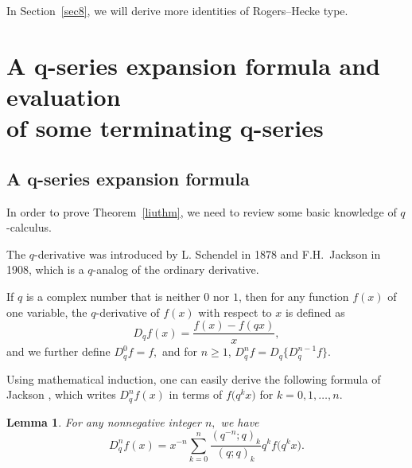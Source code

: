 \documentclass[pdftex]{sigma}
\numberwithin{equation}{section}
\newtheorem{Lemma}[Theorem]{Lemma}
\begin{document}
In Section~\ref{sec8}, we will derive more identities of Rogers--Hecke type.

\section[A q-series expansion formula and evaluation of some terminating q-series]{A $\boldsymbol{q}$-series expansion formula and evaluation \\ of some terminating $\boldsymbol{q}$-series}\label{sec2}

\subsection[A q-series expansion formula]{A $\boldsymbol{q}$-series expansion formula}
In order to prove Theorem~\ref{liuthm}, we need to review some basic knowledge of $q$-calculus.

The $q$-derivative was introduced by L. Schendel \cite{Schendel} in 1878 and F.H.~Jackson \cite{Jackson1908} in 1908, which is a $q$-analog of the ordinary derivative.
\begin{Definition}%
	If $q$ is a complex number that is neither $0$ nor $1$, then for any function $f(x)$ of one variable, the $q$-derivative of $f(x)$
	with respect to $x$ is defined as
	\begin{equation*}
		{D}_{q}f(x)=\frac{f(x)-f(qx)}{x},
	\end{equation*}
	and we further define ${D}_{q}^0 f=f,$ and for $n\ge 1$, ${D}_{q}^n f={D}_{q}\bigl\{{D}_{q}^{n-1}f\bigr\}.$
\end{Definition}

Using mathematical induction, one can easily derive the following formula of Jackson \cite{Jackson1908}, which writes
${D}^n_{q}f(x) $ in terms of $f\bigl(q^k x\bigr)$ for $k=0, 1, \ldots, n$.
\begin{Lemma}\label{JacsonLem} For any nonnegative integer $n,$ we have
	\[
	{D}^n_{q}f(x)=x^{-n} \sum_{k=0}^n \frac{(q^{-n}; q)_k}{(q; q)_k}q^k f\bigl(q^k x\bigr).
	\]
\end{Lemma}
\end{document}
